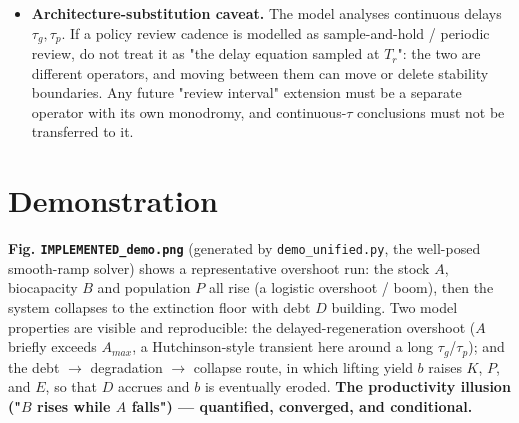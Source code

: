 \documentclass[11pt]{article}
\begin{document}
\begin{itemize}
\item \textbf{Architecture-substitution caveat.} The model analyses continuous delays $\tau{}_{g}, \tau{}_{p}$. If a policy review cadence is modelled as sample-and-hold / periodic review, do not treat it as "the delay equation sampled at $T_{r}$": the two are different operators, and moving between them can move or delete stability boundaries. Any future "review interval" extension must be a separate operator with its own monodromy, and continuous-$\tau{}$ conclusions must not be transferred to it.
\end{itemize}

\section{Demonstration}

\textbf{Fig. \texttt{IMPLEMENTED\_demo.png}} (generated by \texttt{demo\_unified.py}, the well-posed smooth-ramp solver) shows a representative overshoot run: the stock $A$, biocapacity $B$ and population $P$ all rise (a logistic overshoot / boom), then the system collapses to the extinction floor with debt $D$ building. Two model properties are visible and reproducible: the delayed-regeneration overshoot ($A$ briefly exceeds $A_{max}$, a Hutchinson-style transient here around a long $\tau{}_{g}$/$\tau{}_{p}$); and the debt \ensuremath{\to{}} degradation \ensuremath{\to{}} collapse route, in which lifting yield $b$ raises $K$, $P$, and $E$, so that $D$ accrues and $b$ is eventually eroded. \textbf{The productivity illusion ("$B$ rises while $A$ falls") — quantified, converged, and conditional.}
\end{document}
